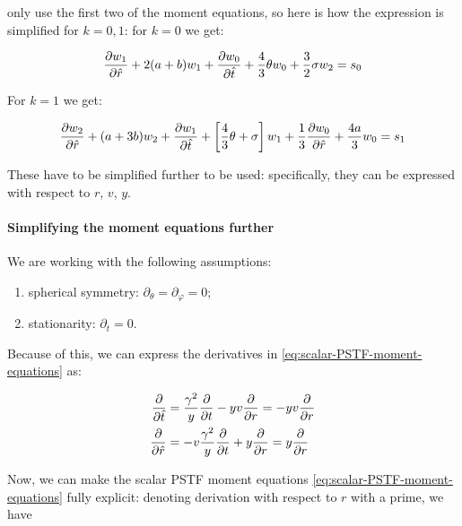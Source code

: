 \documentclass[main.tex]{subfiles}
\begin{document}
\textcite[]{NobiliTurollaZampieri:1991dec} only use the first two of the moment equations, so here is how the expression is simplified for \(k=0,1\):
for \(k=0\) we get:

\begin{equation}
    \pdv{w_{1}}{\hat{r}} +2( a+ b) w_{1}+\pdv{w_0}{\hat{t}}+\frac{4}{3} \theta w_{0} + \frac{3}{2} \sigma w_{2} = s_0
\end{equation}

For \(k=1\) we get:

\begin{equation}
    \pdv{w_{2}}{\hat{r}} + (a+3 b) w_{2}+\pdv{w_1}{\hat{t}}+\left[\frac{4}{3} \theta+ \sigma\right] w_{1} +\frac{1}{3} \pdv{w_{0}}{\hat{r}}+\frac{4 a}{3} w_{0} = s_1
\end{equation}

These have to be simplified further to be used: specifically, they can be expressed with respect to \(r\), \(v\), \(y\).

\paragraph{Simplifying the moment equations further}


We are working with the following assumptions:

\begin{enumerate}
  \item spherical symmetry: \(\partial_\theta = \partial_\varphi = 0\);
  \item stationarity: \(\partial_t = 0\).
\end{enumerate}

Because of this, we can express the derivatives in \eqref{eq:scalar-PSTF-moment-equations} as:

\begin{subequations}
\begin{align}
  \pdv{}{\hat{t}} &= \frac{\gamma^2}{y} \pdv{}{t} - yv \pdv{}{r} = - yv \pdv{}{r}  \\
  \pdv{}{\hat{r}} &= -v \frac{\gamma^2}{y} \pdv{}{t} + y \pdv{}{r} = y \pdv{}{r}
\end{align}
\end{subequations}

Now, we can make the scalar PSTF moment equations \eqref{eq:scalar-PSTF-moment-equations} fully explicit: denoting derivation with respect to \(r\) with a prime, we have
\end{document}
